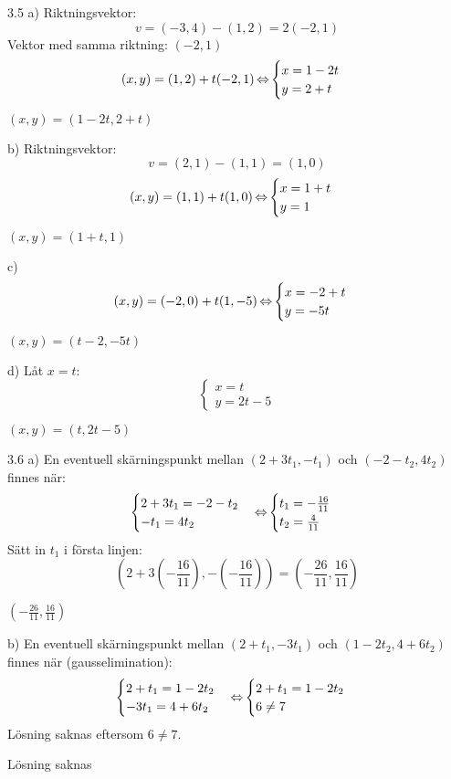 \begin{task}{3.5 a)}
	Riktningsvektor:
	\[v=(-3,4)-(1,2)=2(-2,1)\]
	Vektor med samma riktning: $(-2,1)$
	\[(x,y)=(1,2)+t(-2,1) \operatorname{\Leftrightarrow}
	\begin{cases}
		x=1-2t \\
		y=2+t
	\end{cases}\]
	
	\ans $(x,y)=(1-2t,2+t)$
\end{task}

\begin{task}{b)}
	Riktningsvektor:
	\[v=(2,1)-(1,1)=(1,0)\]
	\[(x,y)=(1,1)+t(1,0) \operatorname{\Leftrightarrow}
	\begin{cases}
		x=1+t \\
		y=1
	\end{cases}\]
	
	\ans $(x,y)=(1+t,1)$
\end{task}

\begin{task}{c)}
	\[(x,y)=(-2,0)+t(1,-5) \operatorname{\Leftrightarrow}
	\begin{cases}
		x=-2+t \\
		y=-5t
	\end{cases}\]
	
	\ans $(x,y)=(t-2,-5t)$
\end{task}

\begin{task}{d)}
	Låt $x=t$:
	\[\begin{cases}
		x=t \\
		y=2t-5
	\end{cases}\]
	
	\ans $(x,y)=(t,2t-5)$
\end{task}

\begin{task}{3.6 a)}
	En eventuell skärningspunkt mellan $(2+3t_1,-t_1)$ och $(-2-t_2,4t_2)$ finnes när:
	\[\begin{cases}
		2+3t_1=-2-t_2 \\
		-t_1=4t_2
	\end{cases} \operatorname{\Leftrightarrow}
	\begin{cases}
		t_1=-\frac{16}{11} \\
		t_2=\frac{4}{11}
	\end{cases}\]
	Sätt in $t_1$ i första linjen:
	\[(2+3(-\frac{16}{11}),-(-\frac{16}{11}))=(-\frac{26}{11},\frac{16}{11})\]
	
	\ans $(-\frac{26}{11},\frac{16}{11})$
\end{task}

\begin{task}{b)}
	En eventuell skärningspunkt mellan $(2+t_1,-3t_1)$ och $(1-2t_2,4+6t_2)$ finnes när (gausselimination):
	\[\begin{cases}
		2+t_1=1-2t_2 \\
		-3t_1=4+6t_2
	\end{cases} \operatorname{\Leftrightarrow}
	\begin{cases}
		2+t_1=1-2t_2 \\
		6\neq7
	\end{cases}\]
	Lösning saknas eftersom $6\neq7$.

	\ans Lösning saknas
\end{task}

